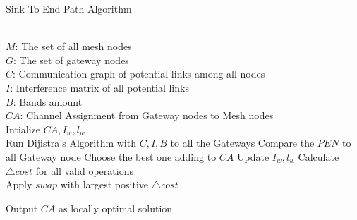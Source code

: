 \begin{algorithm}
    \small
\caption{Sink To End Path Algorithm}
\label{algorithms:step}
\begin{algorithmic}[1]
\REQUIRE  ~~\\
	$M$: The set of all mesh nodes\\
	$G$: The set of gateway nodes\\
	$C$: Communication graph of potential links among all nodes\\
	$I$: Interference matrix of all potential links \\
	$B$: Bands amount
\ENSURE ~~\\    
$CA$: Channel Assignment from Gateway nodes to Mesh nodes\\
\STATE Intialize $CA,I_w,l_w$\\
		\STATE Run Dijistra's Algorithm with $C,I,B$ to all the Gateways
		\STATE Compare the $PEN$ to all Gateway node
		\STATE Choose the best one adding to $CA$
		\STATE Update $I_w,l_w$
\STATE Calculate $\triangle cost$ for all valid operations\\
\STATE Apply $swap$ with largest positive $\triangle cost$
\ENDWHILE 

Output $CA$ as locally optimal solution\\
\end{algorithmic}
\end{algorithm}


